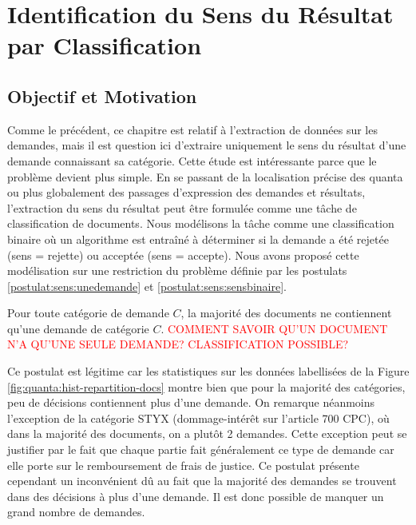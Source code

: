 \chapter{Identification du Sens du Résultat par Classification}
\label{chap:sensresultat}

\section{Objectif et Motivation}
\label{sec:sensresultat:motivation}
Comme le précédent, ce chapitre est relatif à l'extraction de données sur les demandes, mais  il est question ici d'extraire uniquement le sens du résultat d'une demande connaissant sa catégorie. Cette étude est intéressante parce que le problème devient plus simple. En se passant de la localisation précise des quanta ou plus globalement des passages d'expression des demandes et résultats, l'extraction du sens du résultat peut être formulée comme une tâche de classification de documents. Nous modélisons la tâche comme une classification binaire où un algorithme est entraîné à déterminer si la demande a été rejetée (sens = rejette) ou acceptée (sens = accepte). Nous avons proposé cette modélisation sur une restriction du problème définie par les postulats \ref{postulat:sens:unedemande} et \ref{postulat:sens:sensbinaire}.

\begin{postulat}\label{postulat:sens:unedemande}
Pour toute catégorie de demande $C$, la majorité des documents ne contiennent qu'une demande de catégorie $C$. \textcolor{red}{COMMENT SAVOIR QU'UN DOCUMENT N'A QU'UNE SEULE DEMANDE? CLASSIFICATION POSSIBLE?}
\end{postulat} 
Ce postulat est légitime car les statistiques sur les données labellisées de la Figure \ref{fig:quanta:hist-repartition-docs} montre bien que pour la majorité des catégories, peu de décisions contiennent plus d'une demande. On remarque néanmoins l'exception de la catégorie STYX (dommage-intérêt sur l'article 700 CPC), où dans la majorité des documents, on a plutôt 2 demandes. Cette exception peut se justifier par le fait que chaque partie fait généralement ce type de demande car elle porte sur le remboursement de frais de justice. Ce postulat présente cependant un inconvénient dû au fait que la majorité des demandes se trouvent dans des décisions à plus d'une demande. Il est donc possible de manquer un grand nombre de demandes. %

